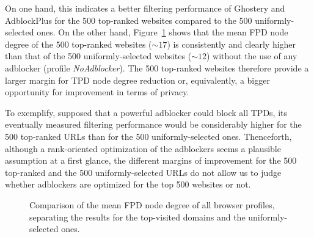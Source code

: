 On one hand, this indicates a better filtering performance of Ghostery and AdblockPlus for the 500 top-ranked websites compared to the 500 uniformly-selected ones. On the other hand, Figure~\ref{fig:top_last_domains_comparison} shows that the mean FPD node degree of the 500 top-ranked websites ($\sim17$) is consistently and clearly higher than that of the 500 uniformly-selected websites ($\sim12$) without the use of any adblocker (profile \textit{NoAdblocker}). The 500 top-ranked websites therefore provide a larger margin for TPD node degree reduction or, equivalently, a bigger opportunity for improvement in terms of privacy.

To exemplify, supposed that a powerful adblocker could block all TPDs, its eventually measured filtering performance would be considerably higher for the 500 top-ranked URLs than for the 500 uniformly-selected ones.
Thenceforth, although a rank-oriented optimization of the adblockers seems a plausible assumption at a first glance, the different margins of improvement for the 500 top-ranked and the 500 uniformly-selected URLs do not allow us to judge whether adblockers are optimized for the top 500 websites or not.

\begin{figure}[!t]
  \centering
  
   \hfill
  
  \caption{Comparison of the mean FPD node degree of all browser profiles, separating the results for the top-visited domains and the uniformly-selected ones.}
  \label{fig:top_last_domains_comparison}
  \end{figure}

